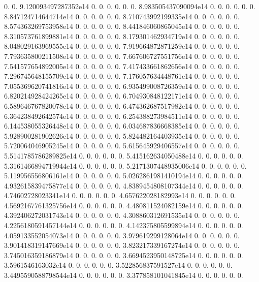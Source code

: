 0. 0. 9.\+120093497287352e14 0. 0. 0. 0. 0. 0. 8.\+983505437090094e14 0. 0. 0. 0. 0. 0. 8.\+847124714644714e14 0. 0. 0. 0. 0. 0. 8.\+710743992199335e14 0. 0. 0. 0. 0. 0. 8.\+574363269753958e14 0. 0. 0. 0. 0. 0. 8.\+441846060865045e14 0. 0. 0. 0. 0. 0. 8.\+310573761899881e14 0. 0. 0. 0. 0. 0. 8.\+179301462934719e14 0. 0. 0. 0. 0. 0. 8.\+048029163969555e14 0. 0. 0. 0. 0. 0. 7.\+919664872871259e14 0. 0. 0. 0. 0. 0. 7.\+793635800211508e14 0. 0. 0. 0. 0. 0. 7.\+667606727551756e14 0. 0. 0. 0. 0. 0. 7.\+541577654892005e14 0. 0. 0. 0. 0. 0. 7.\+417433661862656e14 0. 0. 0. 0. 0. 0. 7.\+296745648155709e14 0. 0. 0. 0. 0. 0. 7.\+176057634448761e14 0. 0. 0. 0. 0. 0. 7.\+055369620741816e14 0. 0. 0. 0. 0. 0. 6.\+935499008726359e14 0. 0. 0. 0. 0. 0. 6.\+820214928424265e14 0. 0. 0. 0. 0. 0. 6.\+704930848122171e14 0. 0. 0. 0. 0. 0. 6.\+589646767820078e14 0. 0. 0. 0. 0. 0. 6.\+474362687517982e14 0. 0. 0. 0. 0. 0. 6.\+364238492642574e14 0. 0. 0. 0. 0. 0. 6.\+254388273984511e14 0. 0. 0. 0. 0. 0. 6.\+144538055326448e14 0. 0. 0. 0. 0. 0. 6.\+034687836668385e14 0. 0. 0. 0. 0. 0. 5.\+928900281902626e14 0. 0. 0. 0. 0. 0. 5.\+824482164403935e14 0. 0. 0. 0. 0. 0. 5.\+720064046905245e14 0. 0. 0. 0. 0. 0. 5.\+615645929406557e14 0. 0. 0. 0. 0. 0. 5.\+5141785786289825e14 0. 0. 0. 0. 0. 0. 5.\+415162634050488e14 0. 0. 0. 0. 0. 0. 5.\+3161466894719944e14 0. 0. 0. 0. 0. 0. 5.\+2171307448935006e14 0. 0. 0. 0. 0. 0. 5.\+119956556806161e14 0. 0. 0. 0. 0. 0. 5.\+0262861981410194e14 0. 0. 0. 0. 0. 0. 4.\+932615839475877e14 0. 0. 0. 0. 0. 0. 4.\+8389454808107344e14 0. 0. 0. 0. 0. 0. 4.\+74602728023341e14 0. 0. 0. 0. 0. 0. 4.\+657622028182993e14 0. 0. 0. 0. 0. 0. 4.\+5692167761325756e14 0. 0. 0. 0. 0. 0. 4.\+480811524082159e14 0. 0. 0. 0. 0. 0. 4.\+392406272031743e14 0. 0. 0. 0. 0. 0. 4.\+308860312691535e14 0. 0. 0. 0. 0. 0. 4.\+2256180591457144e14 0. 0. 0. 0. 0. 0. 4.\+142375805599894e14 0. 0. 0. 0. 0. 0. 4.\+059133552054073e14 0. 0. 0. 0. 0. 0. 3.\+979619299128064e14 0. 0. 0. 0. 0. 0. 3.\+901418319147669e14 0. 0. 0. 0. 0. 0. 3.\+823217339167274e14 0. 0. 0. 0. 0. 0. 3.\+745016359186879e14 0. 0. 0. 0. 0. 0. 3.\+6694523950148725e14 0. 0. 0. 0. 0. 0. 3.\+5961546163032e14 0. 0. 0. 0. 0. 0. 3.\+522856837591527e14 0. 0. 0. 0. 0. 0. 3.\+4495590588798544e14 0. 0. 0. 0. 0. 0. 3.\+377858101041845e14 0. 0. 0. 0. 0. 0. 